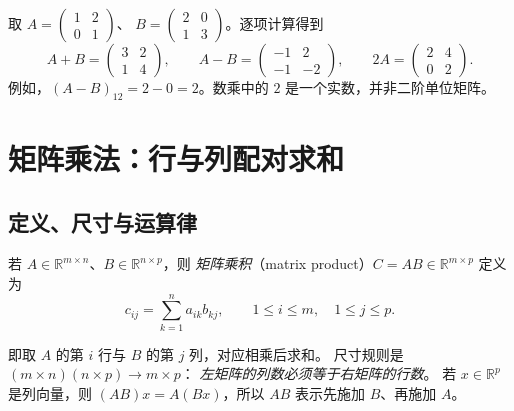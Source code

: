 \documentclass[UTF8,12pt,a4paper,fontset=fandol]{ctexart}
\begin{document}
\begin{example}[贯穿全文的一组矩阵]
\label{ex:matrix-operations-pair}
取 $A=\begin{pmatrix}1&2\\0&1\end{pmatrix}$、
$B=\begin{pmatrix}2&0\\1&3\end{pmatrix}$。逐项计算得到
\[
  A+B=\begin{pmatrix}3&2\\1&4\end{pmatrix},\qquad
  A-B=\begin{pmatrix}-1&2\\-1&-2\end{pmatrix},\qquad
  2A=\begin{pmatrix}2&4\\0&2\end{pmatrix}.
\]
例如，$(A-B)_{12}=2-0=2$。数乘中的 $2$ 是一个实数，并非二阶单位矩阵。
\end{example}

\section{矩阵乘法：行与列配对求和}

\subsection{定义、尺寸与运算律}

\begin{definition}[矩阵乘法]
若 $A\in\mathbb R^{m\times n}$、$B\in\mathbb R^{n\times p}$，则
\emph{矩阵乘积}（matrix product）$C=AB\in\mathbb R^{m\times p}$ 定义为
\begin{equation}
  c_{ij}=\sum_{k=1}^{n}a_{ik}b_{kj},\qquad
  1\le i\le m,\quad 1\le j\le p.
  \label{eq:matrix-product-entry}
\end{equation}
\end{definition}

即取 $A$ 的第 $i$ 行与 $B$ 的第 $j$ 列，对应相乘后求和。
尺寸规则是 $(m\times n)(n\times p)\longrightarrow m\times p$：
\emph{左矩阵的列数必须等于右矩阵的行数}。
若 $x\in\mathbb R^p$ 是列向量，则 $(AB)x=A(Bx)$，所以 $AB$ 表示先施加 $B$、再施加 $A$。
\end{document}
